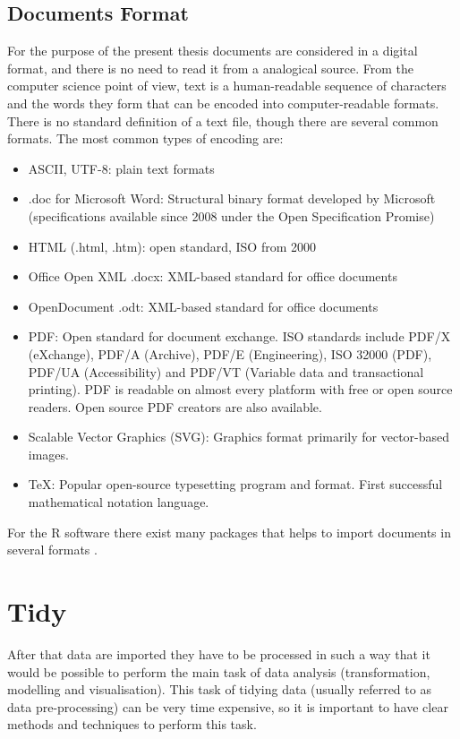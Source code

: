 \documentclass[]{book}
\begin{document}
\subsection{Documents Format}\label{sotatoolsimportformat}

For the purpose of the present thesis documents are considered in a
digital format, and there is no need to read it from a analogical
source. From the computer science point of view, text is a
human-readable sequence of characters and the words they form that can
be encoded into computer-readable formats. There is no standard
definition of a text file, though there are several common formats. The
most common types of encoding are:

\begin{itemize}
\item
  ASCII, UTF-8: plain text formats
\item
  .doc for Microsoft Word: Structural binary format developed by
  Microsoft (specifications available since 2008 under the Open
  Specification Promise)
\item
  HTML (.html, .htm): open standard, ISO from 2000
\item
  Office Open XML .docx: XML-based standard for office documents
\item
  OpenDocument .odt: XML-based standard for office documents
\item
  PDF: Open standard for document exchange. ISO standards include PDF/X
  (eXchange), PDF/A (Archive), PDF/E (Engineering), ISO 32000 (PDF),
  PDF/UA (Accessibility) and PDF/VT (Variable data and transactional
  printing). PDF is readable on almost every platform with free or open
  source readers. Open source PDF creators are also available.
\item
  Scalable Vector Graphics (SVG): Graphics format primarily for
  vector-based images.
\item
  TeX: Popular open-source typesetting program and format. First
  successful mathematical notation language.
\end{itemize}

For the R software there exist many packages that helps to import
documents in several formats \citep{readr2017r}.

\section{Tidy}\label{sotatoolstidy}

After that data are imported they have to be processed in such a way
that it would be possible to perform the main task of data analysis
(transformation, modelling and visualisation). This task of tidying data
(usually referred to as data pre-processing) can be very time expensive,
so it is important to have clear methods and techniques to perform this
task.
\end{document}
